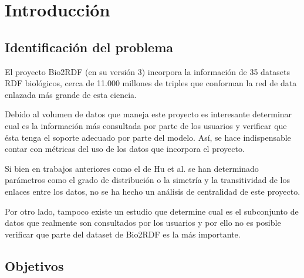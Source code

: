 
\chapter{Introducción}

\section{Identificación del problema}
El proyecto Bio2RDF (en su versión 3) incorpora la información de 35 datasets
RDF biológicos, cerca de 11.000 millones de triples que conforman la red de data
enlazada más grande de esta ciencia.

Debido al volumen de datos que maneja este proyecto es interesante determinar
cual es la información más consultada por parte de los usuarios y verificar que
ésta tenga el soporte adecuado por parte del modelo. Así, se hace indispensable
contar con métricas del uso de los datos que incorpora el proyecto. 

Si bien en trabajos anteriores como el de Hu et al.\cite{hu2015link} se han
determinado parámetros como el grado de distribución o la simetría y la
transitividad de los enlaces entre los datos, no se ha hecho un análisis de
centralidad de este proyecto.

Por otro lado, tampoco existe un estudio que determine cual es el subconjunto de
datos que realmente son consultados por los usuarios y por ello no es posible
verificar que parte del dataset de Bio2RDF es la más importante.

\section{Objetivos}
